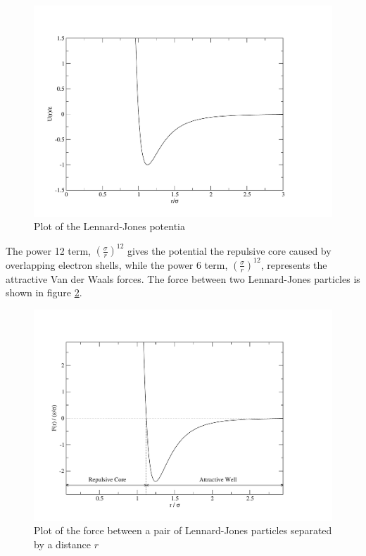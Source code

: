 \message{ !name(main.tex)}\documentclass[12pt]{UoAthesis}
\begin{document}
\begin{figure}[htp] 
  \begin{center}
    \includegraphics[clip,width=\textwidth]{figures/ljPlot} 
    \caption{\label{fig:ljPot} Plot of the Lennard-Jones potentia} 
  \end{center}
\end{figure}

The power 12 term, $\left(\frac{\sigma}{r}\right)^{12}$ gives the
potential the repulsive core caused by overlapping electron shells,
while the power 6 term, $\left(\frac{\sigma}{r}\right)^{12}$,
represents the attractive Van der Waals forces.  The force between two
Lennard-Jones particles is shown in figure \ref{fig:ljForce}.

\begin{figure}[htp] 
  \begin{center}
    \includegraphics[clip,width=\textwidth]{figures/ljForce} 
    \caption{\label{fig:ljForce} Plot of the force between
      a pair of Lennard-Jones particles separated by a distance $r$}
  \end{center}
\end{figure}
\end{document}
